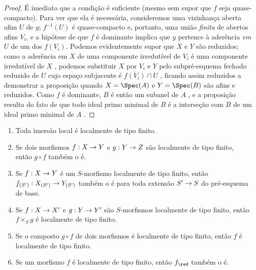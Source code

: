 \documentclass[oneside]{amsart}
\makeatletter
\newcommand{\ega@arrow}[2]{\mathchoice{#1}{#2}{#2}{#2}}
\renewcommand{\to}{\ega@arrow{\longrightarrow}{\rightarrow}}
\let\EGAOriginalLabel\label
\renewcommand{\label}[1]{\phantomsection\EGAOriginalLabel{#1}}
\makeatother
\begin{document}
\begin{proof}
É imediato que a condição é suficiente (mesmo sem supor que $f$ seja quase-compacto).
Para ver que ela é necessária, consideremos uma vizinhança aberta afim $U$ de $y$;
$f^{-1}(U)$ é quase-compacto e, portanto, uma união \emph{finita} de abertos afins $V_i$, e a hipótese de que $f$ é dominante implica que $y$ pertence à aderência \emph{em $U$} de um dos $f(V_i)$.
Podemos evidentemente supor que $X$ e $Y$ são reduzidos;
como a aderência em $X$ de uma componente irredutível de $V_i$ é uma componente irredutível de $X$ , podemos substituir $X$ por $V_i$ e $Y$ pelo subpré-esquema fechado reduzido de $U$ cujo espaço subjacente é $\overline{f(V_i)}\cap U$ , ficando assim reduzidos a demonstrar a proposição quando $X=\Spec(A)$ e $Y=\Spec(B)$ são afins e reduzidos.
Como $f$ é dominante, $B$ é então um subanel de $A$ , e a proposição resulta do fato de que todo ideal primo minimal de $B$ é a interseção com $B$ de um ideal primo minimal de $A$ .
\end{proof}

\begin{proposition}[6.6.6]
\label{I.6.6.6}
\medskip\noindent
\begin{enumerate}
  \item[{\rm(i)}] Toda imersão local é localmente de tipo finito.
  \item[{\rm(ii)}] Se dois morfismos $f:X\to Y$ e $g:Y\to Z$ são localmente de tipo finito, então $g\circ f$ também o é.
  \item[{\rm(iii)}] Se $f:X\to Y$ é um $S$-morfismo localmente de tipo finito, então $f_{(S')}:X_{(S')}\to Y_{(S')}$ também o é para toda extensão $S'\to S$ do pré-esquema de base.
  \item[{\rm(iv)}] Se $f:X\to X'$ e $g:Y\to Y'$ são $S$-morfismos localmente de tipo finito, então $f\times_S g$ é localmente de tipo finito.
  \item[{\rm(v)}] Se o composto $g\circ f$ de dois morfismos é localmente de tipo finito, então $f$ é localmente de tipo finito.
  \item[{\rm(vi)}] Se um morfismo $f$ é localmente de tipo finito, então $f_\red$ também o é.
\end{enumerate}
\end{proposition}
\end{document}
